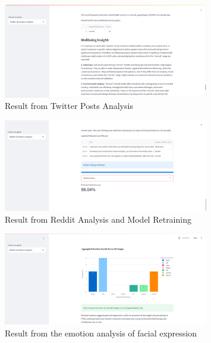 \begin{figure}[h!]  
    \centering
    \includegraphics[width=0.8\textwidth]{App Images/10 Interface.png}  
    \caption{Result from Twitter Posts Analysis}
    \label{10i}  %
\end{figure}

\begin{figure}[h!]  
    \centering
    \includegraphics[width=0.8\textwidth]{App Images/17 Interface.png}  
    \caption{Result from Reddit Analysis and Model Retraining}
    \label{10i}  %
\end{figure}

\pagebreak

\begin{figure}[h!]  
    \centering
    \includegraphics[width=0.8\textwidth]{App Images/12-1 Interface.png}  
    \caption{Result from the emotion analysis of facial expression}
    \label{10i23}  %
\end{figure}

